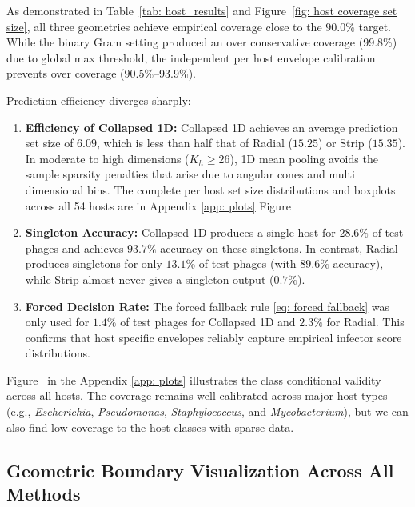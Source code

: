 As demonstrated in Table~\ref{tab: host_results} and Figure~\ref{fig: host coverage set size}, all three geometries 
achieve empirical coverage close to the $90.0\%$ target. While the binary Gram setting produced an over conservative coverage 
(99.8\%) due to global max threshold, the independent per host envelope calibration prevents over coverage (90.5\%--93.9\%).

\newpage
Prediction efficiency diverges sharply:
\begin{enumerate}[label=(\roman*)]
    \item \textbf{Efficiency of Collapsed 1D:} Collapsed 1D achieves an average prediction set size of $6.09$, which is less than 
           half that of Radial ($15.25$) or Strip ($15.35$). In moderate to high dimensions ($K_h \ge 26$), 1D mean pooling avoids 
           the sample sparsity penalties that arise due to angular cones and multi dimensional bins. The complete per host set size 
           distributions and boxplots across all 54 hosts are in Appendix \ref{app: plots} 
           Figure~
    \item \textbf{Singleton Accuracy:} Collapsed 1D produces a single host for $28.6\%$ of test phages and achieves $93.7\%$ 
           accuracy on these singletons. In contrast, Radial produces singletons for only $13.1\%$ of test phages (with $89.6\%$ 
           accuracy), while Strip almost never gives a singleton output ($0.7\%$).
    \item \textbf{Forced Decision Rate:} The forced fallback rule \eqref{eq: forced fallback} was only used for $1.4\%$ of 
           test phages for Collapsed 1D and $2.3\%$ for Radial. This confirms that host specific envelopes reliably capture 
           empirical infector score distributions.
\end{enumerate}


Figure~ in the Appendix \ref{app: plots} illustrates the class 
conditional validity across all hosts. The coverage remains well calibrated across major host types (e.g., \emph{Escherichia}, 
\emph{Pseudomonas}, \emph{Staphylococcus}, and \emph{Mycobacterium}), but we can also find low coverage to the host classes with 
sparse data.



\subsection{Geometric Boundary Visualization Across All Methods}
\label{sec5.3.4: geometric comparison}



